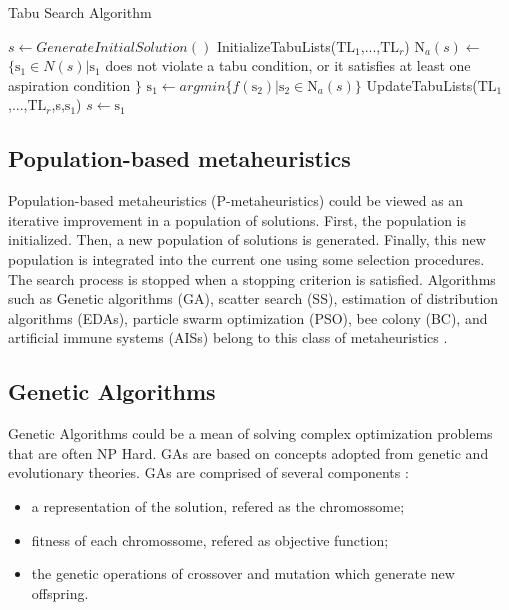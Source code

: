 \begin{algorithm}[h]
  \caption{Tabu Search Algorithm}\label{tsa}
  \begin{algorithmic}[2]
    
    \State $s\gets GenerateInitialSolution()$
    \State InitializeTabuLists($\mbox{TL}_1$,...,$\mbox{TL}_r$)
    \State $\mbox{N}_a(s)\gets$ $\{\mbox{s}_1 \in N(s) |\mbox{s}_1$ does not violate a tabu condition, or it satisfies at least one aspiration condition $\}$ 
    \State $\mbox{s}_1\gets argmin\{f(\mbox{s}_2)|\mbox{s}_2 \in \mbox{N}_a(s) \}$
    \State UpdateTabuLists($\mbox{TL}_1$,...,$\mbox{TL}_r$,s,$\mbox{s}_1$)
    \State $s\gets \mbox{s}_1$
    \EndWhile
      
  \end{algorithmic}
\end{algorithm}

\subsection{Population-based metaheuristics}

Population-based metaheuristics (P-metaheuristics) could be viewed as an iterative improvement in a population of solutions. First, the population is initialized. Then, a new population of solutions is generated. Finally, this new population is integrated into the current one using some selection procedures. The search process is stopped when a stopping criterion is satisfied. Algorithms such as Genetic algorithms (GA), scatter search (SS), estimation of distribution algorithms (EDAs), particle swarm optimization (PSO), bee colony (BC), and artificial immune systems (AISs) belong to this class of metaheuristics \cite{talbi2009metaheuristics}. 

\subsection{Genetic Algorithms}

Genetic Algorithms could be a mean of solving complex optimization problems that are often NP Hard. GAs are based on concepts adopted from genetic and evolutionary theories. GAs are comprised of several components \cite{hong2000simultaneously} \cite{shousha2003performance} :

\begin{itemize}
\item a representation of the solution, refered as the chromossome;
\item fitness of each chromossome, refered as objective function;
\item the genetic operations of crossover and mutation which generate new offspring. 
\end{itemize}


